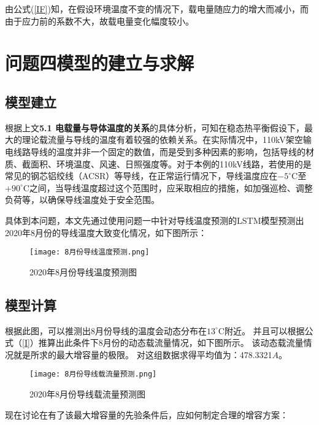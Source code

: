 \documentclass[withoutpreface,bwprint]{cumcmthesis}  %
\begin{document}
        由公式(\ref{IF})知，在假设环境温度不变的情况下，载电量随应力的增大而减小，而由于应力前的系数不大，故载电量变化幅度较小。

	\section{问题四模型的建立与求解}
 
        \subsection{模型建立}
        根据上文\textbf{5.1 电载量与导体温度的关系}的具体分析，可知在稳态热平衡假设下，最大的理论载流量与导线的温度有着较强的依赖关系。在实际情况中，110kV架空输电线路导线的温度并非一个固定的数值，而是受到多种因素的影响，包括导线的材质、截面积、环境温度、风速、日照强度等。对于本例的110kV线路，若使用的是常见的钢芯铝绞线（ACSR）等导线，在正常运行情况下，导线温度应在$-5^\circ$C至$+90^\circ$C之间，当导线温度超过这个范围时，应采取相应的措施，如加强巡检、调整负荷等，以确保导线温度处于安全范围。
        
        具体到本问题，本文先通过使用问题一中针对导线温度预测的LSTM模型预测出2020年8月份的导线温度大致变化情况，如下图所示：

        \begin{figure}[htbp] 
                \centering  
                \texttt{[image: 8月份导线温度预测.png]}  
                \caption{2020年8月份导线温度预测图}
        \end{figure}

        \subsection{模型计算}
        根据此图，可以推测出8月份导线的温度会动态分布在$13^\circ$C附近。
        并且可以根据公式（\ref{I}）推算出此条件下8月份的动态载流量情况，如下图所示。
        该动态载流量情况就是所求的最大增容量的极限。
        对这组数据求得平均值为：478.3321$A$。

        \begin{figure}[htbp] 
                \centering  
                \texttt{[image: 8月份导线载流量预测.png]}  
                \caption{2020年8月份导线载流量预测图}
        \end{figure}

        
        现在讨论在有了该最大增容量的先验条件后，应如何制定合理的增容方案：
\end{document}
